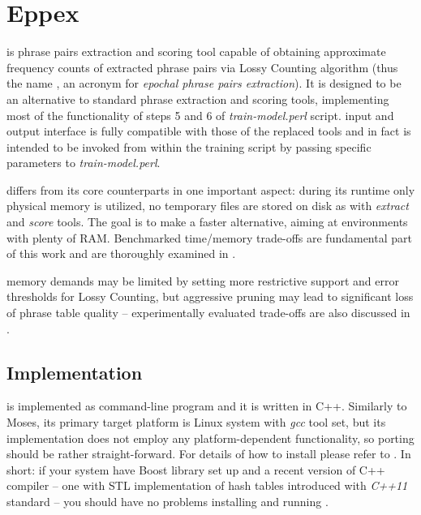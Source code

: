 
\chapter{Eppex}
\label{chap:eppex}

\Eppex{} is phrase pairs extraction and scoring tool capable of obtaining
approximate frequency counts of extracted phrase pairs via Lossy Counting algorithm
(thus the name \eppex{}, an acronym for \emph{epochal phrase pairs extraction}).
It is designed to be an alternative to standard phrase extraction and scoring tools,
implementing most of the functionality of steps 5 and 6 of \emph{train-model.perl} script.
\Eppex{} input and output interface is fully compatible with those of the replaced tools
and \eppex{} in fact is intended to be invoked from within the training script
by passing specific parameters to \emph{train-model.perl}.

\Eppex{} differs from its core counterparts in one important aspect: during its
runtime only physical memory is utilized, no temporary files are stored on disk
as with \emph{extract} and \emph{score} tools.
The goal is to make \eppex{} a faster alternative, aiming at environments with plenty of RAM.
Benchmarked time/memory trade-offs are fundamental part of this work and
are thoroughly examined in .

\Eppex{} memory demands may be limited by setting more restrictive support and error thresholds
for Lossy Counting, but aggressive pruning may lead to significant loss of phrase table quality
-- experimentally evaluated trade-offs are also discussed in .

\section{Implementation}

\Eppex{} is implemented as command-line program and it is written in C++.
Similarly to Moses, its primary target platform is Linux system with \emph{gcc} tool set,
but its implementation does not employ any platform-dependent functionality,
so porting should be rather straight-forward.
For details of how to install \eppex{} please refer to .
In short: if your system have Boost library set up and a recent version of C++ compiler
-- one with STL implementation of hash tables introduced with \emph{C++11} standard --
you should have no problems installing and running \eppex{}.

